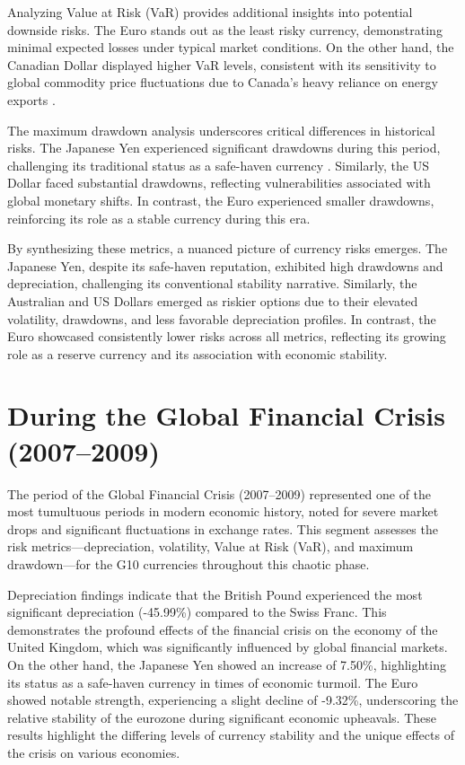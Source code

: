 \documentclass[11pt,a4paper,english,oneside]{book}
\begin{document}
Analyzing Value at Risk (VaR) provides additional insights into potential downside risks. The Euro stands out as the least risky currency, demonstrating minimal expected losses under typical market conditions. On the other hand, the Canadian Dollar displayed higher VaR levels, consistent with its sensitivity to global commodity price fluctuations due to Canada's heavy reliance on energy exports \parencite{chen2003commodity}.

The maximum drawdown analysis underscores critical differences in historical risks. The Japanese Yen experienced significant drawdowns during this period, challenging its traditional status as a safe-haven currency \parencite{kopyl2016safe}. Similarly, the US Dollar faced substantial drawdowns, reflecting vulnerabilities associated with global monetary shifts. In contrast, the Euro experienced smaller drawdowns, reinforcing its role as a stable currency during this era.

By synthesizing these metrics, a nuanced picture of currency risks emerges. The Japanese Yen, despite its safe-haven reputation, exhibited high drawdowns and depreciation, challenging its conventional stability narrative. Similarly, the Australian and US Dollars emerged as riskier options due to their elevated volatility, drawdowns, and less favorable depreciation profiles. In contrast, the Euro showcased consistently lower risks across all metrics, reflecting its growing role as a reserve currency and its association with economic stability.


\section{During the Global Financial Crisis (2007–2009)}
The period of the Global Financial Crisis (2007–2009) represented one of the most tumultuous periods in modern economic history, noted for severe market drops and significant fluctuations in exchange rates. This segment assesses the risk metrics—depreciation, volatility, Value at Risk (VaR), and maximum drawdown—for the G10 currencies throughout this chaotic phase.

Depreciation findings indicate that the British Pound experienced the most significant depreciation (-45.99\%) compared to the Swiss Franc. This demonstrates the profound effects of the financial crisis on the economy of the United Kingdom, which was significantly influenced by global financial markets. On the other hand, the Japanese Yen showed an increase of 7.50\%, highlighting its status as a safe-haven currency in times of economic turmoil. The Euro showed notable strength, experiencing a slight decline of -9.32\%, underscoring the relative stability of the eurozone during significant economic upheavals. These results highlight the differing levels of currency stability and the unique effects of the crisis on various economies.
\end{document}
